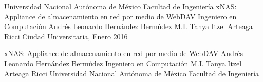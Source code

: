 \documentclass[dvips,letterpaper,12pt,twoside,spanish,headsepline,headinclude]{report}
\begin{document}


{
\pagestyle{empty}
\thesistitle
	{Universidad Nacional Aut\'{o}noma de M\'{e}xico}
	{Facultad de Ingenier\'{i}a}
	{xNAS: Appliance de almacenamiento en red por medio de WebDAV}
	{Ingeniero en Computaci\'{o}n}
	{Andr\'{e}s Leonardo Hern\'{a}ndez Berm\'{u}dez}
	{M.I. Tanya Itzel Arteaga Ricci}
	{Ciudad Universitaria, Enero 2016}

\thesispdfinfo
	{xNAS: Appliance de almacenamiento en red por medio de WebDAV}
	{Andr\'{e}s Leonardo Hern\'{a}ndez Berm\'{u}dez}
	{Ingeniero en Computaci\'{o}n}
	{M.I. Tanya Itzel Arteaga Ricci}
	{Universidad Nacional Aut\'{o}noma de M\'{e}xico}
	{Facultad de Ingenier\'{i}a}

 
 
 
%	
 
 
}

{
\pagestyle{headings}






\appendix

}
{
\printglossaries


\newpage\null\thispagestyle{empty}\newpage
}
\end{document}
